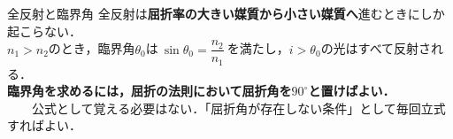 \begin{matome}{全反射と臨界角}
\hspace{3mm}  全反射は{\bf 屈折率の大きい媒質から小さい媒質へ}進むときにしか起こらない．\\
\hspace{3mm}  $n_1>n_2$のとき，臨界角$\theta_0$は$\ \sin\theta_0=\dfrac{n_2}{n_1}\ $を満たし，$i>\theta_0$の光はすべて反射される．\\
\hspace{3mm}  {\bf 臨界角を求めるには，屈折の法則において屈折角を$90^\circ$と置けばよい．}\\
\hspace{3mm} 　　公式として覚える必要はない．「屈折角が存在しない条件」として毎回立式すればよい．
\end{matome}


